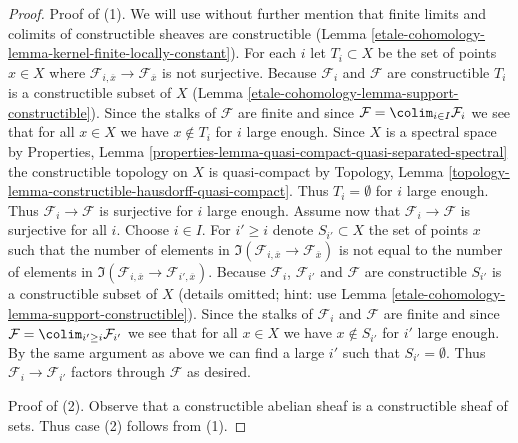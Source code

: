 \begin{proof}
Proof of (1). We will use without further mention that finite limits
and colimits of constructible sheaves are constructible
(Lemma \ref{etale-cohomology-lemma-kernel-finite-locally-constant}).
For each $i$ let $T_i \subset X$ be the set of points $x \in X$
where $\mathcal{F}_{i, \overline{x}} \to \mathcal{F}_{\overline{x}}$
is not surjective. Because $\mathcal{F}_i$ and $\mathcal{F}$ are
constructible $T_i$ is a constructible subset of $X$
(Lemma \ref{etale-cohomology-lemma-support-constructible}).
Since the stalks of $\mathcal{F}$ are finite
and since $\mathcal{F} = \colim_{i \in I} \mathcal{F}_i$ we see
that for all $x \in X$ we have $x \not \in T_i$ for $i$ large enough.
Since $X$ is a spectral space by Properties, Lemma
\ref{properties-lemma-quasi-compact-quasi-separated-spectral}
the constructible topology on $X$ is quasi-compact by
Topology, Lemma \ref{topology-lemma-constructible-hausdorff-quasi-compact}.
Thus $T_i = \emptyset$ for $i$ large enough. Thus
$\mathcal{F}_i \to \mathcal{F}$ is surjective for $i$ large enough.
Assume now that $\mathcal{F}_i \to \mathcal{F}$ is surjective for all $i$.
Choose $i \in I$. For $i' \geq i$ denote $S_{i'} \subset X$ the set of
points $x$ such that the number of elements in
$\Im(\mathcal{F}_{i, \overline{x}} \to \mathcal{F}_{\overline{x}})$
is not equal to the number of elements in
$\Im(\mathcal{F}_{i, \overline{x}} \to \mathcal{F}_{i', \overline{x}})$.
Because $\mathcal{F}_i$, $\mathcal{F}_{i'}$ and $\mathcal{F}$ are
constructible $S_{i'}$ is a constructible subset of $X$
(details omitted; hint: use Lemma \ref{etale-cohomology-lemma-support-constructible}).
Since the stalks of $\mathcal{F}_i$ and $\mathcal{F}$
are finite and since $\mathcal{F} = \colim_{i' \geq i} \mathcal{F}_{i'}$
we see that for all $x \in X$ we have $x \not \in S_{i'}$ for $i'$
large enough. By the same argument as above we can find a large $i'$ such
that $S_{i'} = \emptyset$. Thus $\mathcal{F}_i \to \mathcal{F}_{i'}$
factors through $\mathcal{F}$ as desired.

\medskip\noindent
Proof of (2). Observe that a constructible abelian sheaf is a constructible
sheaf of sets. Thus case (2) follows from (1).


\end{proof}
